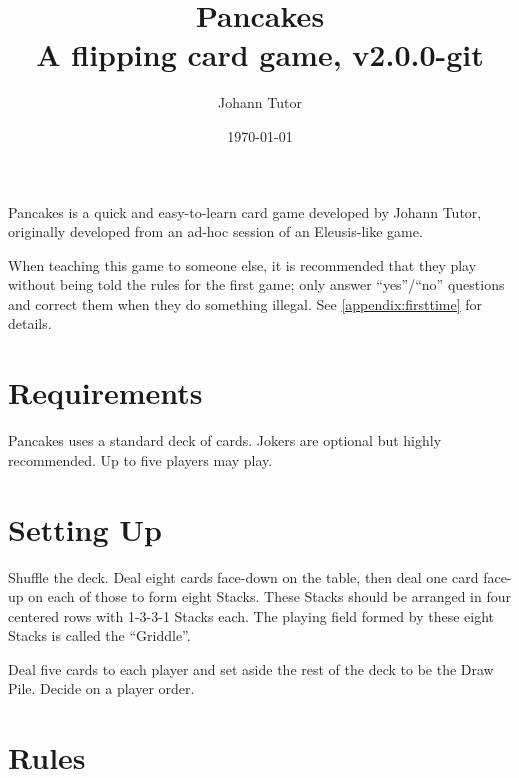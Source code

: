 \documentclass{article}
\newcommand\theversion{2.0.0-git}
\begin{document}
\title{Pancakes\\ \large A flipping card game, v\theversion}
\author{Johann Tutor}
\date{\today}
\maketitle


Pancakes is a quick and easy-to-learn card game developed by Johann Tutor, originally developed from an ad-hoc session of an Eleusis-like game.

When teaching this game to someone else, it is recommended that they play without being told the rules for the first game;
only answer ``yes''/``no'' questions and correct them when they do something illegal. See \autoref{appendix:firsttime} for details.

\tableofcontents

\newpage

\section{Requirements \label{sec:requirements}}

Pancakes uses a standard deck of cards. Jokers are optional but highly recommended.
Up to five players may play.

\section{Setting Up \label{sec:setup}}

Shuffle the deck. Deal eight cards face-down on the table, then deal one card face-up on each of those to form eight Stacks.
These Stacks should be arranged in four centered rows with 1-3-3-1 Stacks each.
The playing field formed by these eight Stacks is called the ``Griddle''.

Deal five cards to each player and set aside the rest of the deck to be the Draw Pile. Decide on a player order.

\section{Rules \label{sec:rules}}
\end{document}
